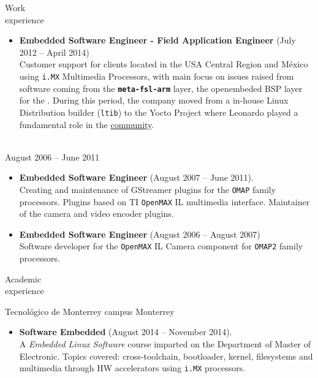\documentclass{resume}
\def\itesm{Tecnol\'ogico de Monterrey campus Monterrey}
\begin{document}
\begin{category}{Work \\experience}
\begin{itemize}
\item \textbf{Embedded Software Engineer - Field Application Engineer} (July 2012 -- April 2014)\\
  Customer support for clients located in the USA Central Region and M\'exico using
  \texttt{i.MX} Multimedia Processors, with main focus on issues raised from software
  coming from the \textbf{\texttt{meta-fsl-arm}} layer, the openembeded BSP layer for
  the . During this period, the company
  moved from a in-house Linux Distribution builder (\texttt{ltib}) to the Yocto Project
  where Leonardo played a fundamental role in the
  \href{https://community.nxp.com/people/LeonardoSandovalGonzalez}{community}.
\end{itemize}

\\
August 2006 -- June 2011
\begin{itemize}
\item \textbf{Embedded Software Engineer} (August 2007 -- June 2011).\\
  Creating and maintenance of GStreamer plugins for the \texttt{OMAP} family
  processors. Plugins based on TI \texttt{OpenMAX} IL multimedia interface.
  Maintainer of the camera and video encoder plugins.
\item \textbf{Embedded Software Engineer} (August 2006 -- August 2007)\\
  Software developer for the \texttt{OpenMAX} IL Camera component for
  \texttt{OMAP2} family processors.
\end{itemize}
\end{category}

\begin{category}{Academic \\experience}

\citem\itesm\\
\begin{itemize}
\item \textbf{Software Embedded} (August 2014 -- November 2014).\\
  A \textit{Embedded Linux Software} course imparted on the Department of
  Master of Electronic. Topics covered: cross-toolchain, bootloader,
  kernel, filesystems and multimedia through HW accelerators using
  \texttt{i.MX} processors.
\end{itemize}
\end{category}
\end{document}
